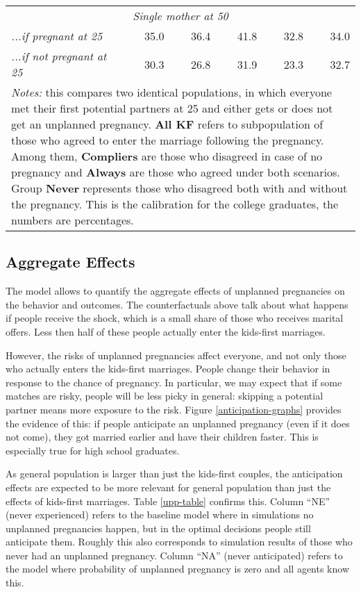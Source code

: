 \documentclass[12pt,letter]{article}
\begin{document}
\begin{table}[h]
\begin{center}
\begin{tabular}{l r r r r r}
\multicolumn{6}{c}{\textit{Single mother at 50}} \\
\textit{...if pregnant at 25} & 35.0 & 36.4 & 41.8 & 32.8 & 34.0\\
\textit{...if not pregnant at 25} & 30.3 & 26.8 & 31.9 & 23.3 & 32.7\\
\hline
\multicolumn{6}{p{0.85\linewidth}}{\footnotesize \textit{Notes:} this compares two identical populations, in which everyone met their first potential partners at 25 and either gets or does not get an unplanned pregnancy. \textbf{All KF} refers to subpopulation of those who agreed to enter the marriage following the pregnancy. Among them, \textbf{Compliers} are those who disagreed in case of no pregnancy and \textbf{Always} are those who agreed under both scenarios. Group \textbf{Never} represents those who disagreed both with and without the pregnancy. This is the calibration for the college graduates, the numbers are percentages.}\\\hline
\end{tabular}
\end{center}
\end{table}

\subsection{Aggregate Effects}
The model allows to quantify the aggregate effects of unplanned pregnancies on the behavior and outcomes. The counterfactuals above talk about what happens if people receive the shock, which is a small share of those who receives marital offers. Less then half of these people actually enter the kids-first marriages. 

However, the risks of unplanned pregnancies affect everyone, and not only those who actually enters the kids-first marriages. People change their behavior in response to the chance of pregnancy. In particular, we may expect that if some matches are risky, people will be less picky in general: skipping a potential partner means more exposure to the risk. Figure \ref{anticipation-graphs} provides the evidence of this: if people anticipate an unplanned pregnancy (even if it does not come), they got married earlier and have their children faster. This is especially true for high school graduates.

As general population is larger than just the kids-first couples, the anticipation effects are expected to be more relevant for general population than just the effects of kids-first marriages. Table \ref{upp-table} confirms this. Column ``NE'' (never experienced) refers to the baseline model where in simulations no unplanned pregnancies happen, but in the optimal decisions people still anticipate them. Roughly this also corresponds to simulation results of those who never had an unplanned pregnancy. Column ``NA'' (never anticipated) refers to the model where probability of unplanned pregnancy is zero and all agents know this.
\end{document}
